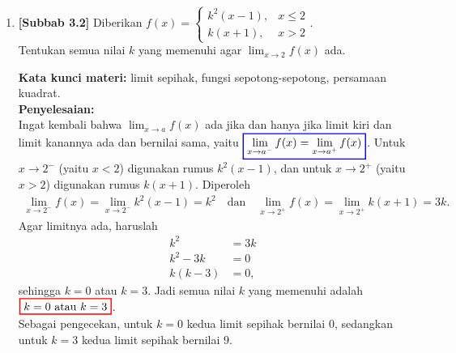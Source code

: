 \documentclass[10pt,openany,a4paper]{article}
\theoremstyle{definition}
\theoremstyle{definition}
\theoremstyle{plain}
\newenvironment{jawab}[2][tes]{%
\par\noindent\textbf{Kata kunci materi:} #1.\\
\textbf{Penyelesaian:} #2%
}{}
\begin{document}
\begin{enumerate}
    \item \textbf{[Subbab 3.2]} Diberikan $f(x)=\begin{cases}
        k^2(x-1), & x\leq 2\\
        k(x+1), & x>2
    \end{cases}$.\\
    Tentukan semua nilai $k$ yang memenuhi agar $\displaystyle\lim_{x\to 2}f(x)$ ada.
    \begin{jawab}[limit sepihak, fungsi sepotong-sepotong, persamaan kuadrat]{~\\
        Ingat kembali bahwa $\displaystyle\lim_{x\to a}f(x)$ ada jika dan hanya jika limit kiri dan limit kanannya ada dan bernilai sama, yaitu $\colorlet{oldcolor}{.}
        \color{blue}
        \setlength{\fboxrule}{1pt} \boxed{\color{oldcolor}\lim_{x \to a^-} f(x) = \lim_{x \to a^+} f(x)}\color{oldcolor}$. Untuk $x\to 2^-$ (yaitu $x<2$) digunakan rumus $k^2(x-1)$, dan untuk $x\to 2^+$ (yaitu $x>2$) digunakan rumus $k(x+1)$. Diperoleh
        \begin{align*}
            \lim_{x\to 2^-} f(x) = \lim_{x\to 2^-} k^2(x-1) = k^2 \quad\text{dan}\quad \lim_{x\to 2^+} f(x) = \lim_{x\to 2^+} k(x+1) = 3k.
        \end{align*}
        Agar limitnya ada, haruslah
        \begin{align*}
            k^2 &= 3k\\
            k^2-3k &= 0\\
            k(k-3) &= 0,
        \end{align*}
        sehingga $k=0$ atau $k=3$. Jadi semua nilai $k$ yang memenuhi adalah $\colorlet{oldcolor}{.}
        \color{red}
        \setlength{\fboxrule}{1pt} \boxed{\color{oldcolor}k=0 \text{ atau } k=3}\color{oldcolor}$.\\
        Sebagai pengecekan, untuk $k=0$ kedua limit sepihak bernilai $0$, sedangkan untuk $k=3$ kedua limit sepihak bernilai $9$.
    }
    \end{jawab}


\end{enumerate}
\end{document}
